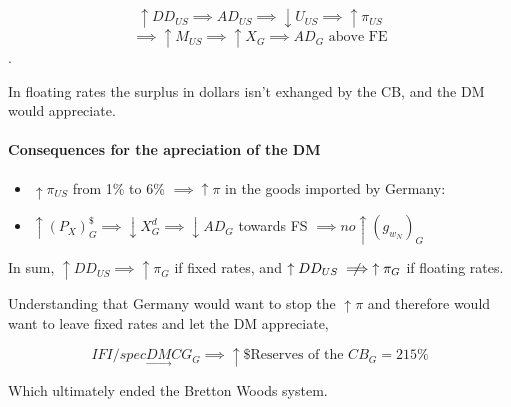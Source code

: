 \documentclass{report}
\begin{document}
$$\uparrow DD_{US} \implies AD_{US} \implies \downarrow U_{US} \implies \uparrow \pi_{US}$$
$$\implies \uparrow M_{US} \implies \uparrow X_G \implies AD_G \text{ above FE}$$.

In floating rates the surplus in dollars isn't exhanged by the CB, and the DM would appreciate. 

\paragraph{Consequences for the apreciation of the DM}

\begin{itemize}
    \item $\uparrow \pi_{US}$ from 1\% to 6\% $\implies \uparrow \pi$ in the goods imported by Germany: 
    \item $\uparrow(P_X)_G^{\$} \implies \downarrow X^d_G \implies \downarrow AD_G$ towards FS $\implies no \uparrow (g_{w_N})_G$
\end{itemize}

In sum, $\uparrow DD_{US} \implies \uparrow \pi_G$ if fixed rates, and $\uparrow DD_{US} \centernot\implies \uparrow \pi_G$ if floating rates. 

Understanding that Germany would want to stop the $\uparrow \pi$ and therefore would want to leave fixed rates and let the DM appreciate, 

$$IFI/spec \underset{\rightarrow}{DM} CG_G\implies \uparrow \text{\$ Reserves of the } CB_G=215\%$$

Which ultimately ended the Bretton Woods system.
\end{document}
